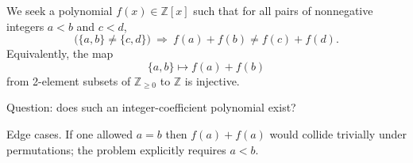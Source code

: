 We seek a polynomial $f(x)\in\mathbb Z[x]$ such that for all pairs of nonnegative integers $a<b$ and $c<d$,
\[
\bigl(\{a,b\}\neq\{c,d\}\bigr)\ \Longrightarrow\ f(a)+f(b)\neq f(c)+f(d).
\]
Equivalently, the map
\[
\{a,b\}\mapsto f(a)+f(b)
\]
from 2-element subsets of $\mathbb Z_{\ge 0}$ to $\mathbb Z$ is injective.

Question: does such an integer-coefficient polynomial exist?

Edge cases.
If one allowed $a=b$ then $f(a)+f(a)$ would collide trivially under permutations; the problem explicitly requires $a<b$.
